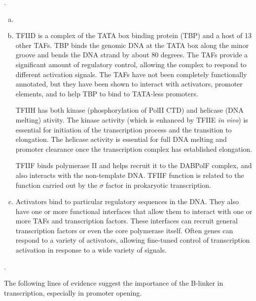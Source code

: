 \documentclass[a4paper, 10pt]{article}
\newcounter{prob_num}
\newcommand{\problem}{\vspace{20pt}\arabic{prob_num}.\stepcounter{prob_num}\par}
\begin{document}
\problem
\begin{enumerate}[a)]
  \item \hspace{15px}
  
  \vspace{350px}
  \item TFIID is a complex of the TATA box binding protein (TBP) and a host of 13 other TAFs. TBP binds the genomic DNA at the TATA box along the minor groove and bends the DNA strand by about 80 degrees. The TAFs provide a significant amount of regulatory control, allowing the complex to respond to different activation signals. The TAFs have not been completely functionally annotated, but they have been shown to interact with activators, promoter elements, and to help TBP to bind to TATA-less promoters.
  
  TFIIH has both kinase (phosphorylation of PolII CTD) and helicase (DNA melting) ativity. The kinase activity (which is enhanced by TFIIE \textit{in vivo}) is essential for initiation of the transcription process and the transition to elongation. The helicase activity is essential for full DNA melting and promoter clearance once the transcription complex has established elongation.
  
  TFIIF binds polymerase II and helps recruit it to the DABPolF complex, and also interacts with the non-template DNA. TFIIF function is related to the function carried out by the $\sigma$ factor in prokaryotic transcription.
  \item Activators bind to particular regulatory sequences in the DNA. They also have one or more functional interfaces that allow them to interact with one or more TAFs and transcription factors. These interfaces can recruit general transcription factors or even the core polymerase itself. Often genes can respond to a variety of activators, allowing fine-tuned control of transcription activation in response to a wide variety of signals.
\end{enumerate}

\clearpage
\problem
The following lines of evidence suggest the importance of the B-linker in transcription, especially in promoter opening.
\end{document}
